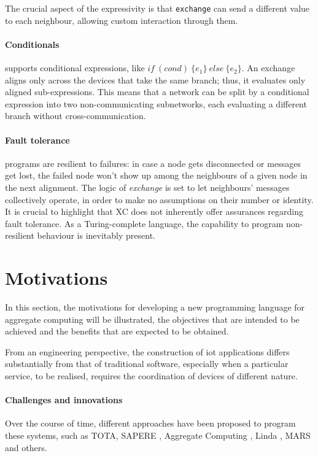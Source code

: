 The crucial aspect of the \xc{} expressivity is that \texttt{exchange} can send a different value to each neighbour,
allowing custom interaction through them.

\paragraph{Conditionals}
\label{par:conditionals}
\xc{} supports conditional expressions, like $if\ (cond)\ \{e_1\}\ else\ \{e_2\}$.
An exchange aligns only across the devices that take the same branch; thus, it evaluates only aligned sub-expressions.
This means that a network can be split by a conditional expression into two non-communicating subnetworks, each
evaluating a different branch without cross-communication.

\paragraph{Fault tolerance}
\xc{} programs are resilient to failures: in case a node gets disconnected or messages get lost, the failed node won't
show up among the neighbours of a given node in the next alignment.
The logic of \emph{exchange} is set to let neighbours' messages collectively operate, in order to make no assumptions
on their number or identity.
It is crucial to highlight that XC does not inherently offer assurances regarding fault tolerance.
As a Turing-complete language, the capability to program non-resilient behaviour is inevitably present.

\section{Motivations}
\label{sec:motivations}

In this section, the motivations for developing a new programming language for aggregate computing will be illustrated,
the objectives that are intended to be achieved and the benefits that are expected to be obtained.

From an engineering perspective, the construction of \ac{iot} applications differs substantially from that of traditional
software, especially when a particular service, to be realised, requires the coordination of devices of different nature.

\paragraph{Challenges and innovations}
Over the course of time, different approaches have been proposed to program these systems, such as TOTA, SAPERE \cite{ZAMBONELLI2011197},
Aggregate Computing \cite{Beal2016}, Linda \cite{10.1145/2363.2433}, MARS \cite{865084} and others.

